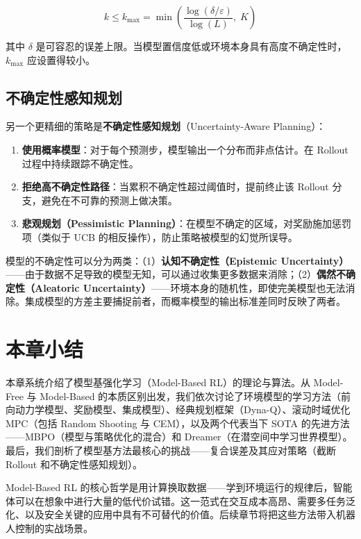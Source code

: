 \[
k \le k_{\max} = \min\left( \frac{\log(\delta / \varepsilon)}{\log(L)}, \; K \right)
\]

其中 $\delta$ 是可容忍的误差上限。当模型置信度低或环境本身具有高度不确定性时，$k_{\max}$ 应设置得较小。

\subsection{不确定性感知规划}

另一个更精细的策略是\textbf{不确定性感知规划}（Uncertainty-Aware Planning）：

\begin{enumerate}
    \item \textbf{使用概率模型}：对于每个预测步，模型输出一个分布而非点估计。在 Rollout 过程中持续跟踪不确定性。
    \item \textbf{拒绝高不确定性路径}：当累积不确定性超过阈值时，提前终止该 Rollout 分支，避免在不可靠的预测上做决策。
    \item \textbf{悲观规划（Pessimistic Planning）}：在模型不确定的区域，对奖励施加惩罚项（类似于 UCB 的相反操作），防止策略被模型的幻觉所误导。
\end{enumerate}

\begin{remark}
模型的不确定性可以分为两类：（1）\textbf{认知不确定性（Epistemic Uncertainty）}——由于数据不足导致的模型无知，可以通过收集更多数据来消除；（2）\textbf{偶然不确定性（Aleatoric Uncertainty）}——环境本身的随机性，即使完美模型也无法消除。集成模型的方差主要捕捉前者，而概率模型的输出标准差同时反映了两者。
\end{remark}

\section{本章小结}

本章系统介绍了模型基强化学习（Model-Based RL）的理论与算法。从 Model-Free 与 Model-Based 的本质区别出发，我们依次讨论了环境模型的学习方法（前向动力学模型、奖励模型、集成模型）、经典规划框架（Dyna-Q）、滚动时域优化 MPC（包括 Random Shooting 与 CEM），以及两个代表当下 SOTA 的先进方法——MBPO（模型与策略优化的混合）和 Dreamer（在潜空间中学习世界模型）。最后，我们剖析了模型基方法最核心的挑战——复合误差及其应对策略（截断 Rollout 和不确定性感知规划）。

Model-Based RL 的核心哲学是用计算换取数据——学到环境运行的规律后，智能体可以在想象中进行大量的低代价试错。这一范式在交互成本高昂、需要多任务泛化、以及安全关键的应用中具有不可替代的价值。后续章节将把这些方法带入机器人控制的实战场景。


